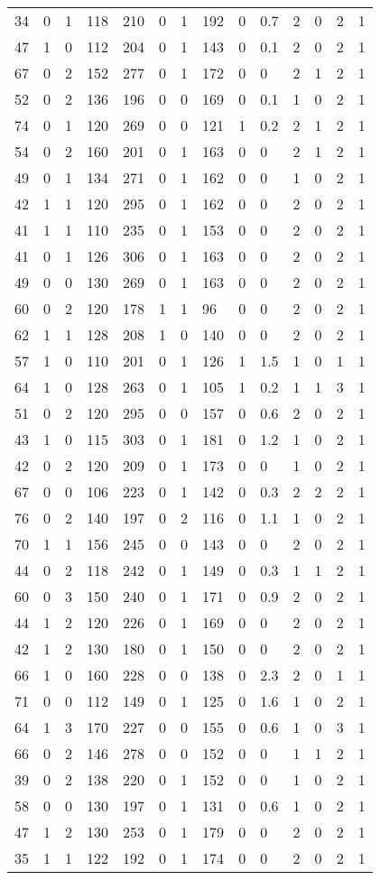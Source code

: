 \documentclass{article}
\begin{document}
\begin{longtable}{|l|l|l|l|l|l|l|l|l|l|l|l|l|l|}
34&0&1&118&210&0&1&192&0&0.7&2&0&2&1 \\ 
47&1&0&112&204&0&1&143&0&0.1&2&0&2&1 \\ 
67&0&2&152&277&0&1&172&0&0&2&1&2&1 \\ 
52&0&2&136&196&0&0&169&0&0.1&1&0&2&1 \\ 
74&0&1&120&269&0&0&121&1&0.2&2&1&2&1 \\ 
54&0&2&160&201&0&1&163&0&0&2&1&2&1 \\ 
49&0&1&134&271&0&1&162&0&0&1&0&2&1 \\ 
42&1&1&120&295&0&1&162&0&0&2&0&2&1 \\ 
41&1&1&110&235&0&1&153&0&0&2&0&2&1 \\ 
41&0&1&126&306&0&1&163&0&0&2&0&2&1 \\ 
49&0&0&130&269&0&1&163&0&0&2&0&2&1 \\ 
60&0&2&120&178&1&1&96&0&0&2&0&2&1 \\ 
62&1&1&128&208&1&0&140&0&0&2&0&2&1 \\ 
57&1&0&110&201&0&1&126&1&1.5&1&0&1&1 \\ 
64&1&0&128&263&0&1&105&1&0.2&1&1&3&1 \\ 
51&0&2&120&295&0&0&157&0&0.6&2&0&2&1 \\ 
43&1&0&115&303&0&1&181&0&1.2&1&0&2&1 \\ 
42&0&2&120&209&0&1&173&0&0&1&0&2&1 \\ 
67&0&0&106&223&0&1&142&0&0.3&2&2&2&1 \\ 
76&0&2&140&197&0&2&116&0&1.1&1&0&2&1 \\ 
70&1&1&156&245&0&0&143&0&0&2&0&2&1 \\ 
44&0&2&118&242&0&1&149&0&0.3&1&1&2&1 \\ 
60&0&3&150&240&0&1&171&0&0.9&2&0&2&1 \\ 
44&1&2&120&226&0&1&169&0&0&2&0&2&1 \\ 
42&1&2&130&180&0&1&150&0&0&2&0&2&1 \\ 
66&1&0&160&228&0&0&138&0&2.3&2&0&1&1 \\ 
71&0&0&112&149&0&1&125&0&1.6&1&0&2&1 \\ 
64&1&3&170&227&0&0&155&0&0.6&1&0&3&1 \\ 
66&0&2&146&278&0&0&152&0&0&1&1&2&1 \\ 
39&0&2&138&220&0&1&152&0&0&1&0&2&1 \\ 
58&0&0&130&197&0&1&131&0&0.6&1&0&2&1 \\ 
47&1&2&130&253&0&1&179&0&0&2&0&2&1 \\ 
35&1&1&122&192&0&1&174&0&0&2&0&2&1 \\ 

\end{longtable}
\end{document}
